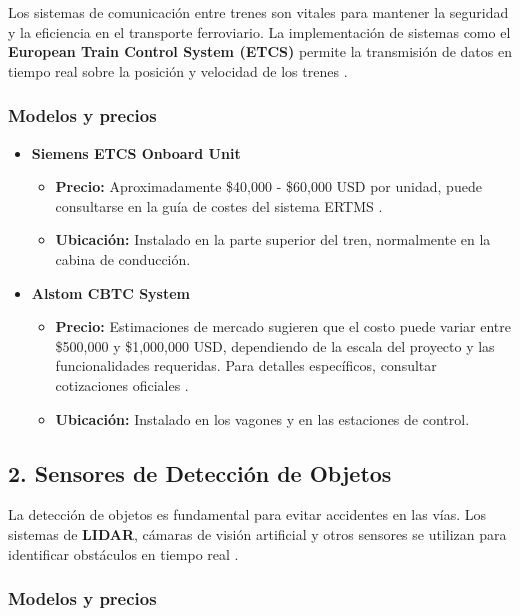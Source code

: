 \documentclass[journal]{IEEEtran}
\begin{document}
Los sistemas de comunicación entre trenes son vitales para mantener la seguridad y la eficiencia en el transporte ferroviario. La implementación de sistemas como el \textbf{European Train Control System (ETCS)} permite la transmisión de datos en tiempo real sobre la posición y velocidad de los trenes \cite{intel2022collision}.  

\subsubsection{Modelos y precios}  

\begin{itemize}  
    \item \textbf{Siemens ETCS Onboard Unit}   
    \begin{itemize}  
        \item \textbf{Precio:} Aproximadamente \$40,000 - \$60,000 USD por unidad, puede consultarse en la guía de costes del sistema ERTMS \cite{eu2021cost}.  
        \item \textbf{Ubicación:} Instalado en la parte superior del tren, normalmente en la cabina de conducción.  
    \end{itemize}  
    \item \textbf{Alstom CBTC System}  
        \begin{itemize}  
            \item \textbf{Precio:} Estimaciones de mercado sugieren que el costo puede variar entre \$500,000 y \$1,000,000 USD, dependiendo de la escala del proyecto y las funcionalidades requeridas. Para detalles específicos, consultar cotizaciones oficiales \cite{marketsandmarkets, railwaytech2019}.  
            \item \textbf{Ubicación:} Instalado en los vagones y en las estaciones de control.  
        \end{itemize}    
\end{itemize}  

\subsection{2. Sensores de Detección de Objetos}  

La detección de objetos es fundamental para evitar accidentes en las vías. Los sistemas de \textbf{LIDAR}, cámaras de visión artificial y otros sensores se utilizan para identificar obstáculos en tiempo real \cite{zhang2022}.  

\subsubsection{Modelos y precios}  
\end{document}
